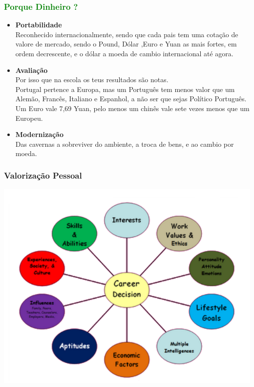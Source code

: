 \begin{frame}
\frametitle{\textcolor{green}{Porque Dinheiro ?}}
\begin{itemize}
	\item \textbf{Portabilidade} \\
	Reconhecido internacionalmente, sendo que cada pais tem uma cotação de valore de mercado, sendo o Pound, Dólar ,Euro e Yuan as mais fortes, em ordem decrescente, e o dólar a moeda de cambio internacional até agora.
	\item \textbf{Avaliação} \\
	Por isso que na escola os teus resultados são notas.\\
	Portugal pertence a Europa, mas um Português tem menos valor que um Alemão, Francês, Italiano e Espanhol, a não ser que sejas Político Português.\\Um Euro vale 7,69 Yuan, pelo menos um chinês vale sete vezes menos que um Europeu.\\
	\item \textbf{Modernização} \\
	Das cavernas a sobreviver do ambiente, a troca de bens, e ao cambio por moeda.
\end{itemize}
\end{frame}
\begin{frame}
\frametitle{Valorização Pessoal}
\begin{center}
\includegraphics[scale=0.4]{./image/Career_Path/Career_Decision_Factors}
\end{center}
\end{frame}
